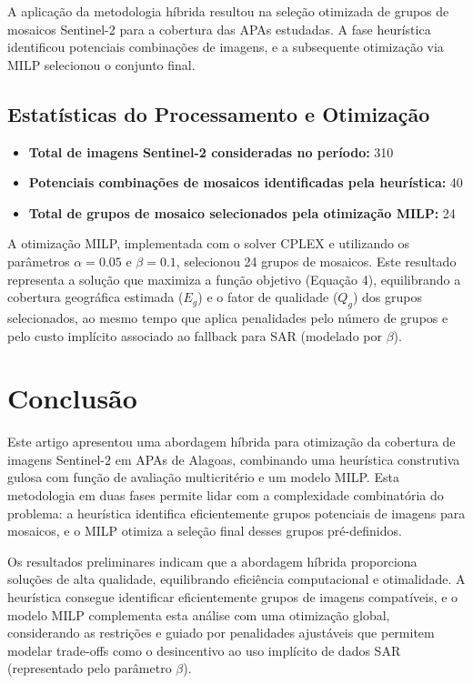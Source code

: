 \documentclass[a4paper,11pt]{article}
\begin{document}
A aplicação da metodologia híbrida resultou na seleção otimizada de grupos de mosaicos Sentinel-2 para a cobertura das APAs estudadas. A fase heurística identificou potenciais combinações de imagens, e a subsequente otimização via MILP selecionou o conjunto final.

\subsection{Estatísticas do Processamento e Otimização}
\begin{itemize}
    \item \textbf{Total de imagens Sentinel-2 consideradas no período:} 310
    \item \textbf{Potenciais combinações de mosaicos identificadas pela heurística:} 40
    \item \textbf{Total de grupos de mosaico selecionados pela otimização MILP:} 24
\end{itemize}

A otimização MILP, implementada com o solver CPLEX e utilizando os parâmetros $\alpha=0.05$ e $\beta=0.1$, selecionou 24 grupos de mosaicos. Este resultado representa a solução que maximiza a função objetivo (Equação 4), equilibrando a cobertura geográfica estimada ($E_g$) e o fator de qualidade ($Q_g$) dos grupos selecionados, ao mesmo tempo que aplica penalidades pelo número de grupos e pelo custo implícito associado ao fallback para SAR (modelado por $\beta$).

\section{Conclusão}
Este artigo apresentou uma abordagem híbrida para otimização da cobertura de imagens Sentinel-2 em APAs de Alagoas, combinando uma heurística construtiva gulosa com função de avaliação multicritério e um modelo MILP. Esta metodologia em duas fases permite lidar com a complexidade combinatória do problema: a heurística identifica eficientemente grupos potenciais de imagens para mosaicos, e o MILP otimiza a seleção final desses grupos pré-definidos.

Os resultados preliminares indicam que a abordagem híbrida proporciona soluções de alta qualidade, equilibrando eficiência computacional e otimalidade. A heurística consegue identificar eficientemente grupos de imagens compatíveis, e o modelo MILP complementa esta análise com uma otimização global, considerando as restrições e guiado por penalidades ajustáveis que permitem modelar trade-offs como o desincentivo ao uso implícito de dados SAR (representado pelo parâmetro $\beta$).

% 
% 
\end{document}
